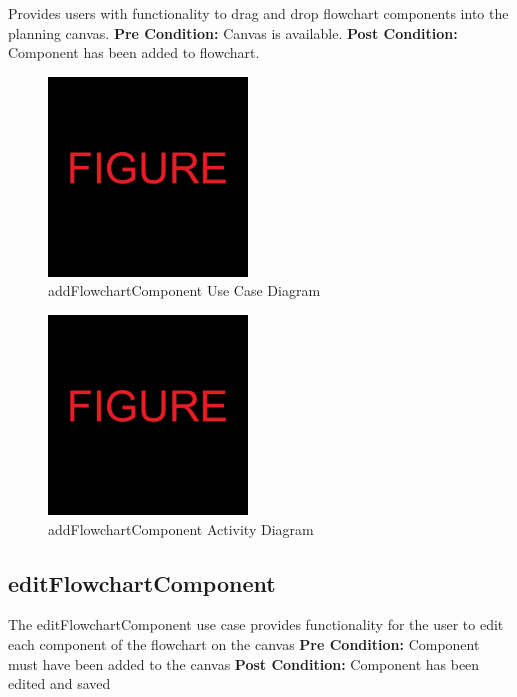 \documentclass[11pt,a4paper,titlepage]{article}
\begin{document}
Provides users with functionality to drag and drop flowchart components into the planning canvas.\newline\newline
\textbf{Pre Condition:} Canvas is available.\newline\newline
\textbf{Post Condition:} Component has been added to flowchart.

\begin{figure}[H]
  \centering
\includegraphics[width=200px]{figure.jpg}
\caption{addFlowchartComponent Use Case Diagram}
\end{figure}

\begin{figure}[H]
  \centering
\includegraphics[width=200px]{figure.jpg}
\caption{addFlowchartComponent Activity Diagram}
\end{figure}

\newpage
\subsection{editFlowchartComponent}

The editFlowchartComponent use case provides functionality for the user to edit each component of the flowchart on the canvas \newline\newline
\textbf{Pre Condition:} Component must have been added to the canvas\newline\newline
\textbf{Post Condition:} Component has been edited and saved
\end{document}
